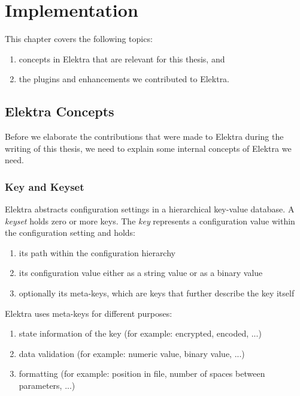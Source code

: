\chapter{Implementation}

This chapter covers the following topics:
\begin{enumerate}
\item concepts in Elektra that are relevant for this thesis, and
\item the plugins and enhancements we contributed to Elektra.
\end{enumerate}


\section{Elektra Concepts}\label{elektra-plugins}

Before we elaborate the contributions that were made to Elektra during the writing of this thesis, we need to explain some internal concepts of Elektra we need.

\subsection{Key and Keyset}

Elektra abstracts configuration settings in a hierarchical key-value database.
A \emph{keyset} holds zero or more keys.
The \emph{key} represents a configuration value within the configuration setting and holds:
\begin{enumerate}
\item its path within the configuration hierarchy
\item its configuration value either as a string value or as a binary value
\item optionally its meta-keys, which are keys that further describe the key itself
\end{enumerate}

Elektra uses meta-keys for different purposes:

\begin{enumerate}
\item state information of the key (for example: encrypted, encoded, ...)
\item data validation (for example: numeric value, binary value, ...)
\item formatting (for example: position in file, number of spaces between parameters, ...)
\end{enumerate}

